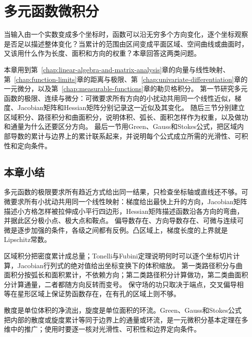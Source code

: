 \chapter{多元函数微积分}
\label{chap:multivariate-calculus}
\label{chap:multivariable-functions}

当输入由一个实数变成多个坐标时，函数可以沿无穷多个方向变化，逐个坐标观察是否足以描述整体变化？当累计的范围由区间变成平面区域、空间曲线或曲面时，又该用什么作为长度、面积和方向的权重？本章回答这两类问题。

本章用到第~\ref{chap:linear-algebra-and-matrix-analysis}章的向量与线性映射、第~\ref{chap:function-limits}章的距离与极限、第~\ref{chap:univariate-differentiation}章的一元微分，以及第~\ref{chap:measurable-functions}章的勒贝格积分。
第一节研究多元函数的极限、连续与微分：可微要求所有方向的小扰动共用同一个线性近似，梯度、Jacobian矩阵和Hessian矩阵分别记录这一近似及其变化。
随后三节分别建立区域积分、路径积分和曲面积分，说明体积、弧长、面积怎样作为权重，以及做功和通量为什么还要区分方向。
最后一节用Green、Gauss和Stokes公式，把区域内部导数的累计与边界上的累计联系起来，并说明每个公式成立所需的光滑性、可积性和定向条件。







\FloatBarrier
\section{本章小结}
\label{sec:multivariable-summary}

多元函数的极限要求所有趋近方式给出同一结果，只检查坐标轴或直线还不够。可微要求所有小扰动共用同一个线性映射：梯度给出最快上升的方向，Jacobian矩阵描述小方格怎样被拉伸成小平行四边形，Hessian矩阵描述函数沿各方向的弯曲，并据此区分极小点、极大点和鞍点。
偏导数存在、方向导数存在、可微与连续可微是逐步加强的条件，各级之间都有反例。凸区域上，梯度长度的上界就是Lipschitz常数。

区域积分把密度累计成总量；Tonelli与Fubini定理说明何时可以逐个坐标切片计算，Jacobian行列式的绝对值给出坐标变换下的体积缩放。
第一类路径积分与曲面积分按弧长和面积累计，不依赖方向；第二类路径积分计算做功，第二类曲面积分计算通量，二者都随方向反转而变号。
保守场的功只取决于端点，交叉偏导相等在星形区域上保证势函数存在，在有孔的区域上则不够。

散度是单位体积的净流出，旋度是单位面积的环流。Green、Gauss和Stokes公式把内部的散度或旋度累计等同于边界上的通量或环流，是一元微积分基本定理在多维中的推广；使用时要逐一核对光滑性、可积性和边界定向条件。
